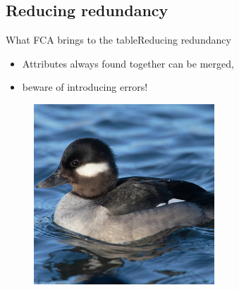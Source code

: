 \subsection{Reducing redundancy}
\begin{frame}{What FCA brings to the table}{Reducing redundancy}

\begin{itemize}
\item Attributes always found together can be merged,
\item<2-> beware of introducing errors!
\end{itemize}

\begin{figure}[ht]
  \begin{minipage}[t]{0.3\linewidth}
    \vspace{0pt}
    \centering
    \includegraphics[width=\textwidth]{img/fca/duck1}
    \\ \color{green}{\footnotesize $hasBill(x) \wedge isDuck(x)$}
  \end{minipage}
  \hfill
  \begin{minipage}[t]{0.3\linewidth}
    \vspace{0pt}

\end{minipage}
\end{figure}
\end{frame}
